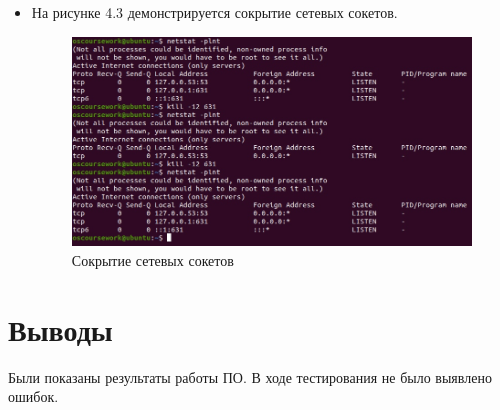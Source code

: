 \begin{itemize}
	\item На рисунке 4.3 демонстрируется сокрытие сетевых сокетов.
	\begin{figure}[H]
		\centering
		\includegraphics[scale=0.45]{inc/img/scr_03.jpg}
		\caption{Сокрытие сетевых сокетов}\label{img:net_hide}
	\end{figure}
\end{itemize}

\section*{Выводы}

Были показаны результаты работы ПО. В ходе тестирования не было
выявлено ошибок.